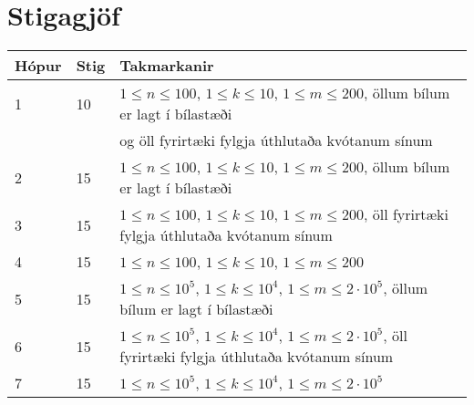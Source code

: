 \section*{Stigagjöf}
\begin{tabular}{|l|l|l|}
\hline
Hópur & Stig & Takmarkanir \\ \hline
1     & 10   & $1 \leq n \leq 100$, $1 \leq k \leq 10$, $1 \leq m \leq 200$, öllum bílum er lagt í bílastæði\\
      &      & og öll fyrirtæki fylgja úthlutaða kvótanum sínum \\ \hline
2     & 15   & $1 \leq n \leq 100$, $1 \leq k \leq 10$, $1 \leq m \leq 200$, öllum bílum er lagt í bílastæði \\ \hline 
3     & 15   & $1 \leq n \leq 100$, $1 \leq k \leq 10$, $1 \leq m \leq 200$, öll fyrirtæki fylgja úthlutaða kvótanum sínum \\ \hline
4     & 15   & $1 \leq n \leq 100$, $1 \leq k \leq 10$,  $1 \leq m \leq 200$ \\ \hline
5     & 15   & $1 \leq n \leq 10^5$, $1 \leq k \leq 10^4$, $1 \leq m \leq 2 \cdot 10^5$, öllum bílum er lagt í bílastæði  \\ \hline %
6     & 15   & $1 \leq n \leq 10^5$, $1 \leq k \leq 10^4$, $1 \leq m \leq 2 \cdot 10^5$, öll fyrirtæki fylgja úthlutaða kvótanum sínum  \\ \hline %
7     & 15   & $1 \leq n \leq 10^5$, $1 \leq k \leq 10^4$, $1 \leq m \leq 2 \cdot 10^5$ \\ \hline %
\end{tabular}
